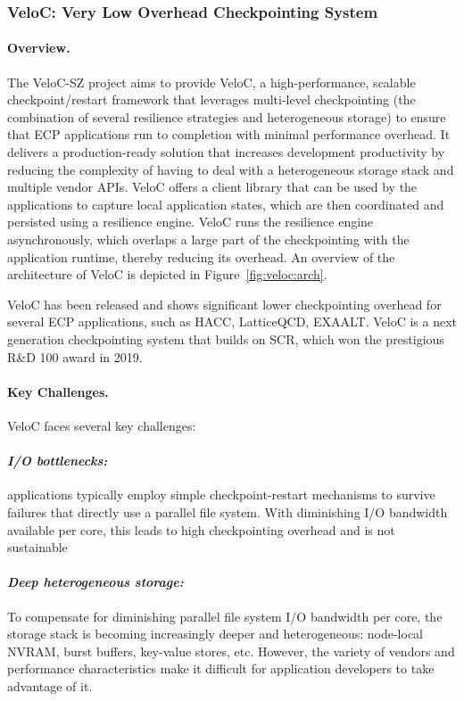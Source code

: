 \subsubsection{ VeloC: Very Low Overhead Checkpointing System}

\paragraph{Overview.}
The VeloC-SZ project aims to provide VeloC, a high-performance,
scalable checkpoint/restart framework that leverages multi-level
checkpointing (the combination of several resilience strategies and
heterogeneous storage) to ensure that ECP applications run to
completion with minimal performance overhead. It delivers a
production-ready solution that increases development productivity by
reducing the complexity of having to deal with a heterogeneous storage
stack and multiple vendor APIs. VeloC offers a client library that can
be used by the applications to capture local application states, which
are then coordinated and persisted using a resilience engine.  VeloC
runs the resilience engine asynchronously, which overlaps a large part
of the checkpointing with the application runtime, thereby reducing
its overhead. An overview of the architecture of VeloC is depicted
in Figure~\ref{fig:veloc:arch}.

VeloC has been released and shows significant lower checkpointing
overhead for several ECP applications, such as HACC, LatticeQCD,
EXAALT. VeloC is a next generation checkpointing system that builds on
SCR, which won the prestigious R\&D 100 award in 2019.

\paragraph{Key Challenges.}
VeloC faces several key challenges:
\vspace{-1em}

\paragraph{\emph{I/O bottlenecks:}} applications typically employ
simple checkpoint-restart mechanisms to survive failures that directly
use a parallel file system. With diminishing I/O bandwidth available
per core, this leads to high checkpointing overhead and is not
sustainable
\vspace{-1em}

\paragraph{\emph{Deep heterogeneous storage:}} To compensate for
diminishing parallel file system I/O bandwidth per core, the storage
stack is becoming increasingly deeper and heterogeneous: node-local
NVRAM, burst buffers, key-value stores, etc. However, the variety of
vendors and performance characteristics make it difficult for
application developers to take advantage of it.
\vspace{-1em}

